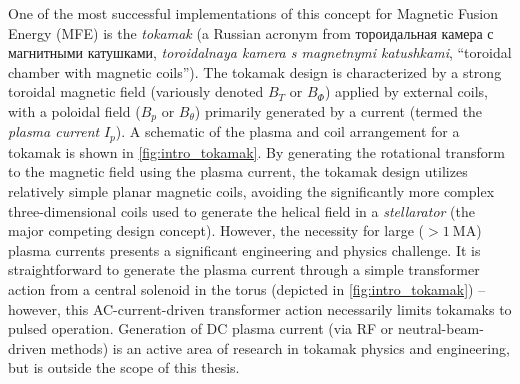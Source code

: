 One of the most successful implementations of this concept for Magnetic Fusion Energy (MFE) is the \emph{tokamak} (a Russian acronym from \foreignlanguage{russian}{тороидальная камера с магнитными катушками}, \emph{toroidalnaya kamera s magnetnymi katushkami}, ``toroidal chamber with magnetic coils'').  The tokamak design is characterized by a strong toroidal magnetic field (variously denoted $B_T$ or $B_\Phi$) applied by external coils, with a poloidal field ($B_p$ or $B_\theta$) primarily generated by a current (termed the \emph{plasma current} $I_p$).  A schematic of the plasma and coil arrangement for a tokamak is shown in \cref{fig:intro_tokamak}.  By generating the rotational transform to the magnetic field using the plasma current, the tokamak design utilizes relatively simple planar magnetic coils, avoiding the significantly more complex three-dimensional coils used to generate the helical field in a \emph{stellarator} (the major competing design concept).  However, the necessity for 
large ($>\SI{1}{\mega\ampere}$) plasma currents presents a significant engineering and physics challenge.  It is straightforward to generate the plasma current through a simple transformer action from a central solenoid in the torus (depicted in \cref{fig:intro_tokamak}) -- however, this AC-current-driven transformer action necessarily limits tokamaks to pulsed operation.  Generation of DC plasma current (via RF or neutral-beam-driven methods) is an active area of research in tokamak physics and engineering, but is outside the scope of this thesis.

